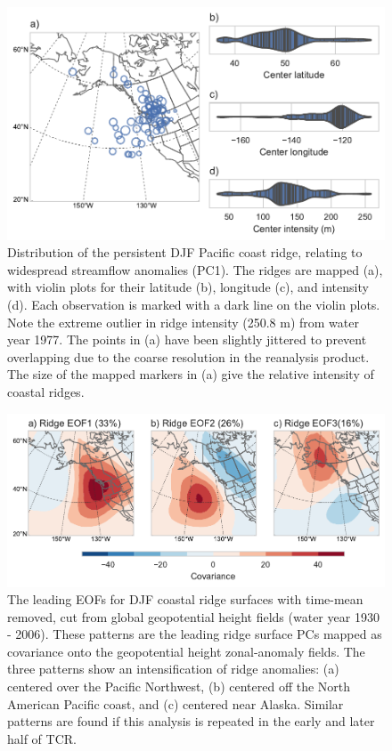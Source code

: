 \documentclass[final, double]{ua-thesis}
\begin{document}
\begin{figure}[ht]
 \centerline{\includegraphics[width=39pc]{p2figures/fig_ridge_stats.pdf}}
  \caption{Distribution of the persistent DJF Pacific coast ridge, relating to widespread streamflow anomalies (PC1). The ridges are mapped (a), with violin plots for their latitude (b), longitude (c), and intensity (d). Each observation is marked with a dark line on the violin plots. Note the extreme outlier in ridge intensity (250.8 m) from water year 1977. The points in (a) have been slightly jittered to prevent overlapping due to the coarse resolution in the reanalysis product. The size of the mapped markers in (a) give the relative intensity of coastal ridges.}\label{fig_ridge_stats}
\end{figure}

\begin{figure}[ht]
 \centerline{\includegraphics[width=39pc]{p2figures/fig_ridge_eofs.pdf}}
  \caption{The leading EOFs for DJF coastal ridge surfaces with time-mean removed, cut from global geopotential height fields (water year 1930 - 2006). These patterns are the leading ridge surface PCs mapped as covariance onto the geopotential height zonal-anomaly fields. The three patterns show an intensification of ridge anomalies: (a) centered over the Pacific Northwest, (b) centered off the North American Pacific coast, and (c) centered near Alaska. Similar patterns are found if this analysis is repeated in the early and later half of TCR.}\label{fig_ridge_eofs}
\end{figure}
\end{document}
